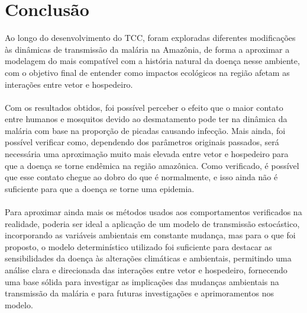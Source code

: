 \chapter{Conclusão}

Ao longo do desenvolvimento do TCC, foram exploradas diferentes modificações às dinâmicas 
de transmissão da malária na Amazônia, de forma a aproximar a modelagem do mais compatível
com a história natural da doença nesse ambiente, com o objetivo final de entender
como impactos ecológicos na região afetam as interações entre vetor e hospedeiro.
\\\\
Com os resultados obtidos, foi possível
perceber o efeito que o maior contato entre humanos e mosquitos devido ao desmatamento
pode ter na dinâmica da malária com base na proporção de picadas causando infecção. 
Mais ainda, foi possível verificar como, dependendo dos parâmetros originais passados,
será necessária uma aproximação muito mais elevada entre vetor e hospedeiro para 
que a doença se torne endêmica na região amazônica. Como verificado, é possível que esse
contato chegue ao dobro do que é normalmente, e isso ainda não é suficiente 
para que a doença se torne uma epidemia.
\\\\
Para aproximar ainda mais os métodos usados aos comportamentos verificados na realidade,
poderia ser ideal a aplicação de um modelo de transmissão estocástico, incorporando as 
variáveis ambientais em constante mudança, mas para o que foi proposto, o modelo determinístico
utilizado foi suficiente para destacar as sensibilidades da doença às alterações 
climáticas e ambientais, permitindo uma análise clara e direcionada 
das interações entre vetor e hospedeiro, fornecendo uma base sólida 
para investigar as implicações das mudanças ambientais na transmissão da malária e para futuras investigações e aprimoramentos nos modelo.
